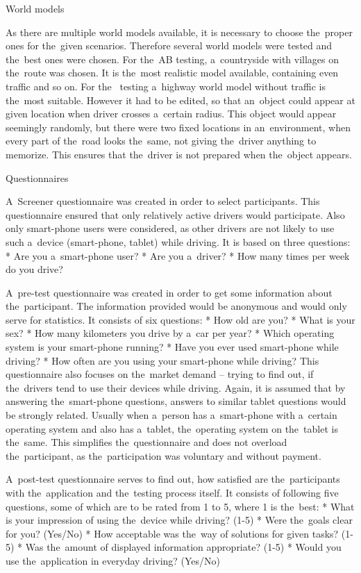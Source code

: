 \seccc World models

As there are multiple world models available, it is necessary to choose the~proper ones for the~given scenarios. Therefore several world models were tested and the~best ones were chosen. For the~AB testing, a~countryside with villages on the~route was chosen. It is the~most realistic model available, containing even traffic and so on. For the~ testing a~highway world model without traffic is the~most suitable. However it had to be edited, so that an~object could appear at given location when driver crosses a~certain radius. This object would appear seemingly randomly, but there were two fixed locations in an~environment, when every part of the~road looks the~same, not giving the~driver anything to memorize. This ensures that the~driver is not prepared when the~object appears.

\seccc Questionnaires

A~Screener questionnaire was created in order to select participants. This questionnaire ensured that only relatively active drivers would participate. Also only smart-phone users were considered, as other drivers are not likely to use such a~device (smart-phone, tablet) while driving. It is based on three questions:
\begitems
* Are you a~smart-phone user?
* Are you a~driver?
* How many times per week do you drive?
\enditems

A~pre-test questionnaire was created in order to get some information about the~participant. The information provided would be anonymous and would only serve for statistics. It consists of six questions:
\begitems
* How old are you?
* What is your sex?
* How many kilometers you drive by a~car per year?
* Which operating system is your smart-phone running?
* Have you ever used smart-phone while driving?
* How often are you using your smart-phone while driving?
\enditems
This questionnaire also focuses on the~market demand -- trying to find out, if the~drivers tend to use their devices while driving. Again, it is assumed that by answering the~smart-phone questions, answers to similar tablet questions would be strongly related. Usually when a~person has a~smart-phone with a~certain operating system and also has a~tablet, the~operating system on the~tablet is the~same. This simplifies the~questionnaire and does not overload the~participant, as the~participation was voluntary and without payment.

A~post-test questionnaire serves to find out, how satisfied are the~participants with the~application and the~testing process itself. It consists of following five questions, some of which are to be rated from 1 to 5, where 1 is the~best:
\begitems
* What is your impression of using the~device while driving? (1-5)
* Were the~goals clear for you? (Yes/No)
* How acceptable was the~way of solutions for given tasks? (1-5)
* Was the~amount of displayed information appropriate? (1-5)
* Would you use the~application in everyday driving? (Yes/No)
\enditems

